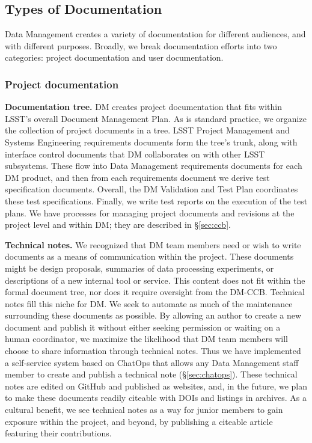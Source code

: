\subsection{Types of Documentation}
\label{sec:doc_types}

Data Management creates a variety of documentation for different audiences, and with different purposes.
Broadly, we break documentation efforts into two categories: project documentation and user documentation.

\subsubsection{Project documentation}
\label{sec:project_docs}

\noindent \textbf{Documentation tree.}
DM creates project documentation that fits within LSST's overall Document Management Plan.\cite{LPM-51}
As is standard practice, we organize the collection of project documents in a tree\cite{LDM-294}.
LSST Project Management and Systems Engineering requirements documents form the tree's trunk, along with interface control documents that DM collaborates on with other LSST subsystems.
These flow into Data Management requirements documents for each DM product, and then from each requirements document we derive test specification documents.
Overall, the DM Validation and Test Plan\cite{LDM-503} coordinates these test specifications.
Finally, we write test reports on the execution of the test plans.
We have processes for managing project documents and revisions at the project level and within DM; they are described in \S\ref{sec:ccb}.

\noindent \textbf{Technical notes.}
We recognized that DM team members need or wish  to write documents as a means of communication within the project.
These documents might be design proposals, summaries of data processing experiments, or descriptions of a new internal tool or service.
This content does not fit within the formal document tree, nor does it require oversight from the DM-CCB.
Technical notes fill this niche for DM.
We seek to automate as much of the maintenance surrounding these documents as possible.
By allowing an author to create a new document and publish it without either seeking permission or waiting on a human coordinator, we maximize the likelihood that DM team members will choose to share information through technical notes.
Thus we have implemented a self-service system based on ChatOps that allows any Data Management staff member to create and publish a technical note (\S\ref{sec:chatops}).
These technical notes are edited on GitHub and published as websites, and, in the future, we plan to make these documents readily citeable with DOIs and listings in archives.
As a cultural benefit, we see technical notes as a way for junior members to gain exposure within the project, and beyond, by publishing a citeable article featuring their contributions.

